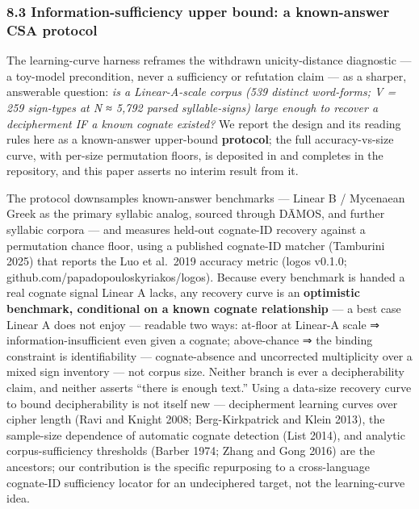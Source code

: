 \documentclass[
  10pt,
]{article}
\begin{document}
\hypertarget{information-sufficiency-upper-bound-a-known-answer-csa-protocol}{%
\subsubsection{8.3 Information-sufficiency upper bound: a known-answer
CSA
protocol}\label{information-sufficiency-upper-bound-a-known-answer-csa-protocol}}

The learning-curve harness reframes the withdrawn unicity-distance
diagnostic --- a toy-model precondition, never a sufficiency or
refutation claim --- as a sharper, answerable question: \emph{is a
Linear-A-scale corpus (539 distinct word-forms; V = 259 sign-types at N
≈ 5,792 parsed syllable-signs) large enough to recover a decipherment IF
a known cognate existed?} We report the design and its reading rules
here as a known-answer upper-bound \textbf{protocol}; the full
accuracy-vs-size curve, with per-size permutation floors, is deposited
in and completes in the repository, and this paper asserts no interim
result from it.

The protocol downsamples known-answer benchmarks --- Linear B /
Mycenaean Greek as the primary syllabic analog, sourced through DĀMOS,
and further syllabic corpora --- and measures held-out cognate-ID
recovery against a permutation chance floor, using a published
cognate-ID matcher (Tamburini 2025) that reports the Luo et al.~2019
accuracy metric (logos v0.1.0; github.com/papadopouloskyriakos/logos).
Because every benchmark is handed a real cognate signal Linear A lacks,
any recovery curve is an \textbf{optimistic benchmark, conditional on a
known cognate relationship} --- a best case Linear A does not enjoy ---
readable two ways: at-floor at Linear-A scale ⇒ information-insufficient
even given a cognate; above-chance ⇒ the binding constraint is
identifiability --- cognate-absence and uncorrected multiplicity over a
mixed sign inventory --- not corpus size. Neither branch is ever a
decipherability claim, and neither asserts ``there is enough text.''
Using a data-size recovery curve to bound decipherability is not itself
new --- decipherment learning curves over cipher length (Ravi and Knight
2008; Berg-Kirkpatrick and Klein 2013), the sample-size dependence of
automatic cognate detection (List 2014), and analytic corpus-sufficiency
thresholds (Barber 1974; Zhang and Gong 2016) are the ancestors; our
contribution is the specific repurposing to a cross-language cognate-ID
sufficiency locator for an undeciphered target, not the learning-curve
idea.
\end{document}
